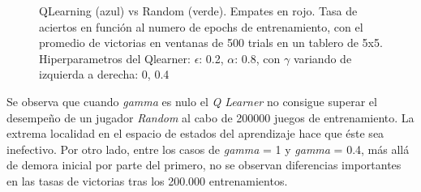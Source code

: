 \documentclass[10pt,a4paper]{article}
\begin{document}
\begin{figure}[H]
\caption{QLearning (azul) vs Random (verde). Empates en rojo. Tasa de aciertos en función al numero de epochs de entrenamiento, con el promedio de victorias en ventanas de 500 trials en un tablero de 5x5. Hiperparametros del Qlearner: $\epsilon$: 0.2, $\alpha$: 0.8, con $\gamma$ variando de izquierda a derecha: 0, 0.4}
\end{figure}

\pagebreak

Se observa que cuando \textit{gamma} es nulo el \textit{Q Learner} no consigue superar el desempeño de un jugador \textit{Random} al cabo de 200000 juegos de entrenamiento. La extrema localidad en el espacio de estados del aprendizaje hace que éste sea inefectivo. Por otro lado, entre los casos de \emph{gamma} = 1 y \emph{gamma} = 0.4, más allá de demora inicial por parte del primero, no se observan diferencias importantes en las tasas de victorias tras los 200.000 entrenamientos.
\end{document}
